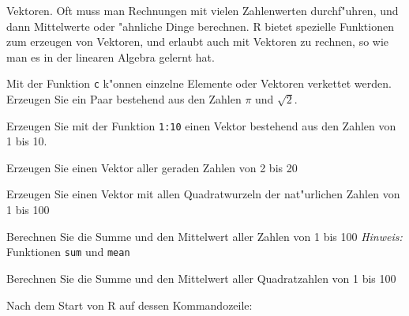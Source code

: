 Vektoren. Oft muss man Rechnungen mit vielen Zahlenwerten durchf"uhren,
und dann Mittelwerte oder "ahnliche Dinge berechnen. R bietet spezielle
Funktionen zum erzeugen von Vektoren, und erlaubt auch mit Vektoren
zu rechnen, so wie man es in der linearen Algebra gelernt hat.
\begin{teilaufgaben}
\item Mit der Funktion {\tt c} k"onnen einzelne Elemente oder
Vektoren verkettet werden. Erzeugen Sie ein Paar bestehend aus
den Zahlen $\pi$ und $\sqrt{2}$.
\item Erzeugen Sie mit der Funktion {\tt 1:10} einen Vektor bestehend
aus den Zahlen von 1 bis 10.
\item Erzeugen Sie einen Vektor aller geraden Zahlen von 2 bis 20
\item Erzeugen Sie einen Vektor mit allen Quadratwurzeln der nat"urlichen
Zahlen von 1 bis 100
\item Berechnen Sie die Summe und den Mittelwert aller Zahlen von 1 bis 100
\quad
{\it Hinweis\/:} Funktionen {\tt sum} und {\tt mean}
\item Berechnen Sie die Summe und den Mittelwert aller Quadratzahlen von 1 bis 100
\end{teilaufgaben}

\begin{loesung}
Nach dem Start von R auf dessen Kommandozeile:

\end{loesung}

